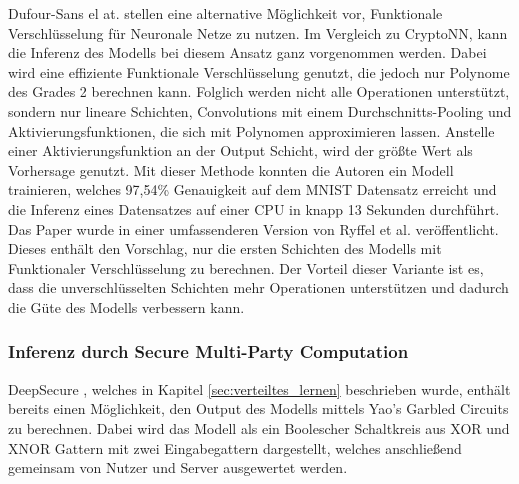 Dufour-Sans el at. \cite{P-105} stellen eine alternative Möglichkeit vor, Funktionale Verschlüsselung für Neuronale Netze zu nutzen.
Im Vergleich zu CryptoNN, kann die Inferenz des Modells bei diesem Ansatz ganz vorgenommen werden.
Dabei wird eine effiziente Funktionale Verschlüsselung genutzt, die jedoch nur Polynome des Grades 2 berechnen kann.
Folglich werden nicht alle Operationen unterstützt, sondern nur lineare Schichten, Convolutions mit einem Durchschnitts-Pooling und Aktivierungsfunktionen, die sich mit Polynomen approximieren lassen.
Anstelle einer Aktivierungsfunktion an der Output Schicht, wird der größte Wert als Vorhersage genutzt.
Mit dieser Methode konnten die Autoren ein Modell trainieren, welches 97,54\% Genauigkeit auf dem MNIST Datensatz \cite{D-MNIST} erreicht und die Inferenz eines Datensatzes auf einer CPU in knapp 13 Sekunden durchführt.
Das Paper wurde in einer umfassenderen Version von Ryffel et al. \cite{P-46} veröffentlicht.
Dieses enthält den Vorschlag, nur die ersten Schichten des Modells mit Funktionaler Verschlüsselung zu berechnen. 
Der Vorteil dieser Variante ist es, dass die unverschlüsselten Schichten mehr Operationen unterstützen und dadurch die Güte des Modells verbessern kann.

\subsubsection*{Inferenz durch Secure Multi-Party Computation}
DeepSecure \cite{P-71}, welches in Kapitel \ref{sec:verteiltes_lernen} beschrieben wurde, enthält bereits einen Möglichkeit, den Output des Modells mittels Yao's Garbled Circuits zu berechnen.
Dabei wird das Modell als ein Boolescher Schaltkreis aus XOR und XNOR Gattern mit zwei Eingabegattern dargestellt, welches anschließend gemeinsam von Nutzer und Server ausgewertet werden.

